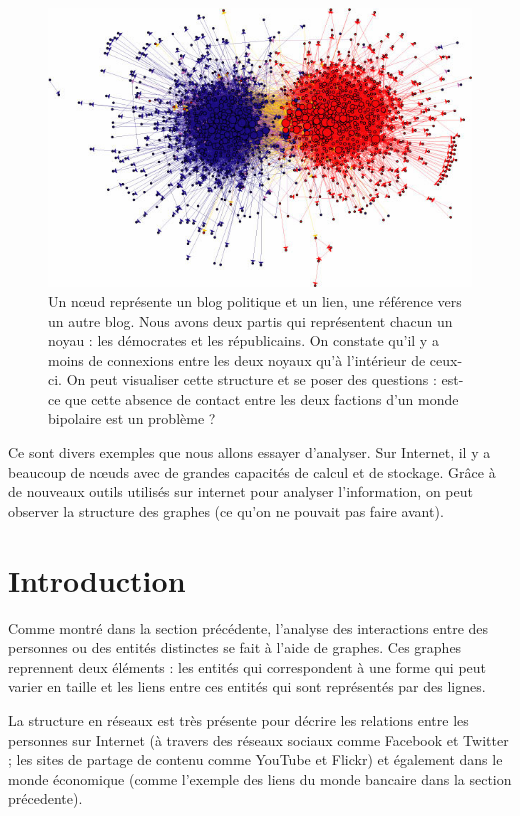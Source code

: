 \begin{figure}[!ht]
\centering
\includegraphics[width=0.65\linewidth]{images/network_structure_of_political_blogs.png}
\caption{Un n\oe ud représente un blog politique et un lien, une référence
    vers un autre blog. Nous avons deux partis qui représentent chacun
    un noyau : les démocrates et les républicains. On constate qu'il y a
    moins de connexions entre les deux noyaux qu'à l'intérieur de
    ceux-ci. On peut visualiser cette structure et se poser des
    questions : est-ce que cette absence de contact entre les deux
factions d'un monde bipolaire est un problème ?}
\end{figure}

\clearpage

Ce sont divers exemples que nous allons essayer d'analyser. Sur Internet, il y a beaucoup de nœuds avec de grandes capacités de calcul et de stockage. Grâce à de nouveaux outils utilisés sur internet pour analyser l'information, on peut observer la structure des graphes (ce qu'on ne pouvait pas faire avant).

\section{Introduction}

Comme montré dans la section précédente, l'analyse des interactions
entre des personnes ou des entités distinctes se fait à l'aide de
graphes. Ces graphes reprennent deux éléments : les entités qui
correspondent à une forme qui peut varier en taille et les liens entre
ces entités qui sont représentés par des lignes. \newline

La structure en réseaux est très présente pour décrire les relations
entre les personnes sur Internet (à travers des réseaux sociaux comme
Facebook et Twitter ; les sites de partage de contenu comme YouTube et
Flickr) et également dans le monde économique (comme
l'exemple des liens du monde bancaire dans la section précedente).
\newline

